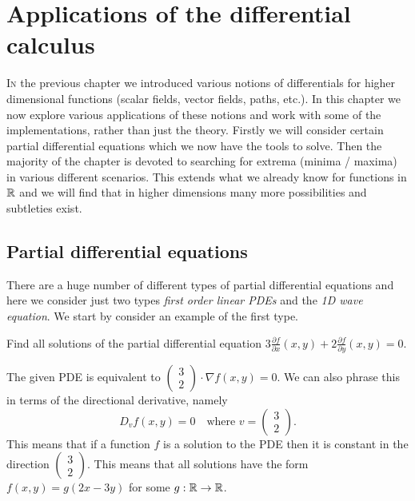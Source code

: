 \chapter{Applications of the differential calculus}

\lettrine{I}{n} the previous chapter we introduced various notions of differentials for higher dimensional functions (scalar fields, vector fields, paths, etc.).
In this chapter we now explore various applications of these notions and work with some of the implementations, rather than just the theory.
Firstly we will consider certain partial differential equations which we now have the tools to solve.
Then the majority of the chapter is devoted to searching for extrema (minima / maxima) in various different scenarios.
This extends what we already know for functions in \(\mathbb{R}\) and we will find that in higher dimensions many more possibilities and subtleties exist.

\section{Partial differential equations}

There are a huge number of different types of partial differential equations and here we consider just two types \emph{first order linear PDEs} and the \emph{1D wave equation}.
We start by consider an example of the first type.

\begin{example*}
    Find all solutions of the partial differential equation
    \(3 \frac{\partial f}{\partial x}(x,y) + 2 \frac{\partial f}{\partial y} (x,y) = 0\).
\end{example*}

\begin{solution}
    The given PDE is equivalent to
    \(\left( \begin{smallmatrix}
            3 \\ 2
        \end{smallmatrix} \right)
    \cdot
    \nabla f(x,y) =0\).
    We can also phrase this in terms of the directional derivative, namely
    \[
        D_{v}f(x,y) = 0 \quad \text{where \(v=\left( \begin{smallmatrix}
                3 \\ 2
            \end{smallmatrix} \right)\)}.
    \]
    This means that if a function \(f\) is a solution to the PDE then it is constant in the direction \(\left( \begin{smallmatrix}
            3 \\ 2
        \end{smallmatrix} \right)\).
    This means that all solutions have the form \(f(x,y) = g(2x-3y)\) for some \(g:\mathbb{R} \to \mathbb{R}\).
\end{solution}


